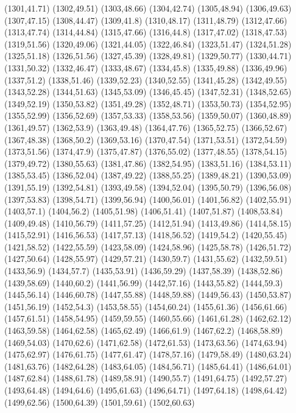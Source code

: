 (1301,41.71)
(1302,49.51)
(1303,48.66)
(1304,42.74)
(1305,48.94)
(1306,49.63)
(1307,47.15)
(1308,44.47)
(1309,41.8)
(1310,48.17)
(1311,48.79)
(1312,47.66)
(1313,47.74)
(1314,44.84)
(1315,47.66)
(1316,44.8)
(1317,47.02)
(1318,47.53)
(1319,51.56)
(1320,49.06)
(1321,44.05)
(1322,46.84)
(1323,51.47)
(1324,51.28)
(1325,51.18)
(1326,51.56)
(1327,45.39)
(1328,49.81)
(1329,50.77)
(1330,44.71)
(1331,50.32)
(1332,46.47)
(1333,48.67)
(1334,45.8)
(1335,49.88)
(1336,49.96)
(1337,51.2)
(1338,51.46)
(1339,52.23)
(1340,52.55)
(1341,45.28)
(1342,49.55)
(1343,52.28)
(1344,51.63)
(1345,53.09)
(1346,45.45)
(1347,52.31)
(1348,52.65)
(1349,52.19)
(1350,53.82)
(1351,49.28)
(1352,48.71)
(1353,50.73)
(1354,52.95)
(1355,52.99)
(1356,52.69)
(1357,53.33)
(1358,53.56)
(1359,50.07)
(1360,48.89)
(1361,49.57)
(1362,53.9)
(1363,49.48)
(1364,47.76)
(1365,52.75)
(1366,52.67)
(1367,48.38)
(1368,50.2)
(1369,53.16)
(1370,47.54)
(1371,53.51)
(1372,54.59)
(1373,51.56)
(1374,47.9)
(1375,47.87)
(1376,55.02)
(1377,48.55)
(1378,54.15)
(1379,49.72)
(1380,55.63)
(1381,47.86)
(1382,54.95)
(1383,51.16)
(1384,53.11)
(1385,53.45)
(1386,52.04)
(1387,49.22)
(1388,55.25)
(1389,48.21)
(1390,53.09)
(1391,55.19)
(1392,54.81)
(1393,49.58)
(1394,52.04)
(1395,50.79)
(1396,56.08)
(1397,53.83)
(1398,54.71)
(1399,56.94)
(1400,56.01)
(1401,56.82)
(1402,55.91)
(1403,57.1)
(1404,56.2)
(1405,51.98)
(1406,51.41)
(1407,51.87)
(1408,53.84)
(1409,49.48)
(1410,56.79)
(1411,57.25)
(1412,51.94)
(1413,49.86)
(1414,58.15)
(1415,52.91)
(1416,56.53)
(1417,57.13)
(1418,56.52)
(1419,54.2)
(1420,55.45)
(1421,58.52)
(1422,55.59)
(1423,58.09)
(1424,58.96)
(1425,58.78)
(1426,51.72)
(1427,50.64)
(1428,55.97)
(1429,57.21)
(1430,59.7)
(1431,55.62)
(1432,59.51)
(1433,56.9)
(1434,57.7)
(1435,53.91)
(1436,59.29)
(1437,58.39)
(1438,52.86)
(1439,58.69)
(1440,60.2)
(1441,56.99)
(1442,57.16)
(1443,55.82)
(1444,59.3)
(1445,56.14)
(1446,60.78)
(1447,55.88)
(1448,59.88)
(1449,56.43)
(1450,53.87)
(1451,56.19)
(1452,54.3)
(1453,58.55)
(1454,60.24)
(1455,61.36)
(1456,61.66)
(1457,61.51)
(1458,54.95)
(1459,59.55)
(1460,55.66)
(1461,61.28)
(1462,62.12)
(1463,59.58)
(1464,62.58)
(1465,62.49)
(1466,61.9)
(1467,62.2)
(1468,58.89)
(1469,54.03)
(1470,62.6)
(1471,62.58)
(1472,61.53)
(1473,63.56)
(1474,63.94)
(1475,62.97)
(1476,61.75)
(1477,61.47)
(1478,57.16)
(1479,58.49)
(1480,63.24)
(1481,63.76)
(1482,64.28)
(1483,64.05)
(1484,56.71)
(1485,64.41)
(1486,64.01)
(1487,62.84)
(1488,61.78)
(1489,58.91)
(1490,55.7)
(1491,64.75)
(1492,57.27)
(1493,64.48)
(1494,64.6)
(1495,61.63)
(1496,64.71)
(1497,64.18)
(1498,64.42)
(1499,62.56)
(1500,64.39)
(1501,59.61)
(1502,60.63)
